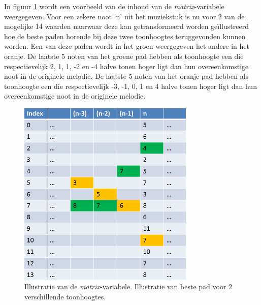 In figuur \ref{figuur:matrix} wordt een voorbeeld van de inhoud van de \textit{matrix}-variabele weergegeven. Voor een zekere noot `n' uit het muziekstuk is nu voor 2 van de mogelijke 14 waarden naarwaar deze kan getransformeerd worden ge\"illustreerd hoe de beste paden horende bij deze twee toonhoogtes teruggevonden kunnen worden. Een van deze paden wordt in het groen weergegeven het andere in het oranje. De laatste 5 noten van het groene pad hebben als toonhoogte een die respectievelijk 2, 1, 1, -2 en -4 halve tonen hoger ligt dan hun overeenkomstige noot in de originele melodie. De laatste 5 noten van het oranje pad hebben als toonhoogte een die respectievelijk -3, -1, 0, 1 en 4 halve tonen hoger ligt dan hun overeenkomstige noot in de originele melodie. 

\begin{figure}[!ht]
  \centering
  \includegraphics[width=0.75\textwidth]{4_Efficient_Toepassen_Transformatie/matrix}
  \caption{Illustratie van de \textit{matrix}-variabele. Illustratie van beste pad voor 2 verschillende toonhoogtes.}
  \label{figuur:matrix}
\end{figure}

